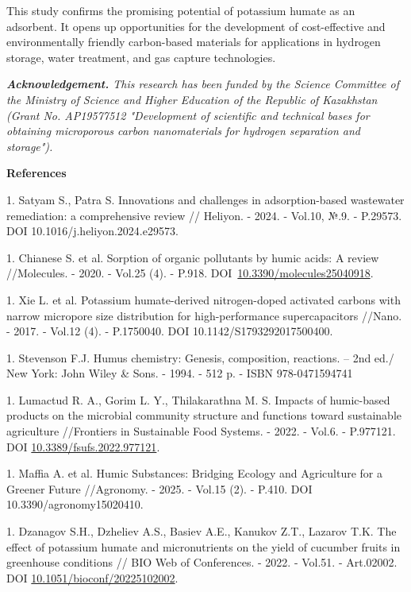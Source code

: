 This study confirms the promising potential of potassium humate as an
adsorbent. It opens up opportunities for the development of
cost-effective and environmentally friendly carbon-based materials for
applications in hydrogen storage, water treatment, and gas capture
technologies.

\emph{{\bfseries Acknowledgement.} This research has been funded by the
Science Committee of the Ministry of Science and Higher Education of the
Republic of Kazakhstan (Grant No. AP19577512 "Development of scientific
and technical bases for obtaining microporous carbon nanomaterials for
hydrogen separation and storage").}

{\bfseries References}


1. Satyam S., Patra S. Innovations and challenges in adsorption-based
wastewater remediation: a comprehensive review // Heliyon. - 2024. -
Vol.10, №.9. - P.29573.
DOI 10.1016/j.heliyon.2024.e29573.

\setcounter{enumi}{1}

1. Chianese S. et al. Sorption of organic pollutants by humic acids: A
review //Molecules. - 2020. - Vol.25 (4). - P.918.
DOI~\href{https://doi.org/10.3390/molecules25040918}{10.3390/molecules25040918}.

1. Xie L. et al. Potassium humate-derived nitrogen-doped activated
carbons with narrow micropore size distribution for high-performance
supercapacitors //Nano. - 2017. - Vol.12 (4). - P.1750040. DOI
10.1142/S1793292017500400.

1. Stevenson F.J. Humus chemistry: Genesis, composition, reactions. --
2nd ed./ New York: John Wiley \& Sons. - 1994. - 512 p. - ISBN
978-0471594741

1. Lumactud R. A., Gorim L. Y., Thilakarathna M. S. Impacts of
humic-based products on the microbial community structure and
functions toward sustainable agriculture //Frontiers in Sustainable
Food Systems. - 2022. - Vol.6. - P.977121. DOI
\href{https://doi.org/10.3389/fsufs.2022.977121}{10.3389/fsufs.2022.977121}.

1. Maffia A. et al. Humic Substances: Bridging Ecology and Agriculture
for a Greener Future //Agronomy. - 2025. - Vol.15 (2). - P.410. DOI
10.3390/agronomy15020410.

1. Dzanagov S.H., Dzheliev A.S., Basiev A.E., Kanukov Z.T., Lazarov T.K.
The effect of potassium humate and micronutrients on the yield of
cucumber fruits in greenhouse conditions // BIO Web of Conferences. -
2022. - Vol.51. - Art.02002. DOI
\href{https://doi.org/10.1051/bioconf/20225102002}{10.1051/bioconf/20225102002}.

